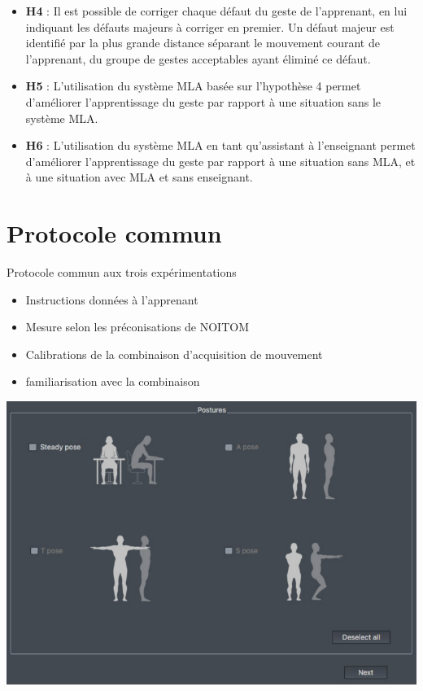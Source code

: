\documentclass[svgnames]{beamer}
\begin{document}
	\begin{frame}
		\begin{itemize}[label=$-$]
			\item \textbf{H4} : Il est possible de corriger chaque défaut du geste de l'apprenant, en lui indiquant les défauts majeurs à corriger en premier. Un défaut majeur est identifié par la plus grande distance séparant le mouvement courant de l'apprenant, du groupe de gestes acceptables ayant éliminé ce défaut.
			\item \textbf{H5} : L'utilisation du système MLA basée sur l'hypothèse 4 permet d'améliorer l'apprentissage du geste par rapport à une situation sans le système MLA.
			\item \textbf{H6} : L'utilisation du système MLA en tant qu'assistant à l'enseignant permet d'améliorer l'apprentissage du geste par rapport à une situation sans MLA, et à une situation avec MLA et sans enseignant.
		\end{itemize}
	\end{frame}

	\section{Protocole commun}
	\begin{frame}{Protocole commun aux trois expérimentations}
		\begin{itemize}[label=$\bullet$]
			\item Instructions données à l'apprenant
			\item Mesure selon les préconisations de NOITOM
			\item Calibrations de la combinaison d'acquisition de mouvement
			\item familiarisation avec la combinaison 
		\end{itemize}
	
		\centering
		\includegraphics[scale=0.3]{img/percpetion_neuron_calibrations.png}
	\end{frame}
	
\end{document}

